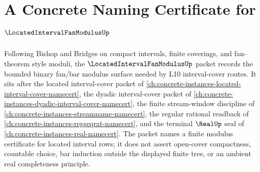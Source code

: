 \chapter{A Concrete Naming Certificate for $\LocatedIntervalFanModulusUp$}
\label{ch:concrete-instances-located-interval-fan-modulus-namecert}

Following Bishop and Bridges on compact intervals, finite coverings, and fan-theorem style moduli, the $\LocatedIntervalFanModulusUp$ packet records the bounded binary fan/bar modulus surface needed by L10 interval-cover routes. It sits after the located interval-cover packet of \autoref{ch:concrete-instances-located-interval-cover-namecert}, the dyadic interval-cover packet of \autoref{ch:concrete-instances-dyadic-interval-cover-namecert}, the finite stream-window discipline of \autoref{ch:concrete-instances-streamname-namecert}, the regular rational readback of \autoref{ch:concrete-instances-regseqrat-namecert}, and the terminal $\RealUp$ seal of \autoref{ch:concrete-instances-real-namecert}. The packet names a finite modulus certificate for located interval rows; it does not assert open-cover compactness, countable choice, bar induction outside the displayed finite tree, or an ambient real completeness principle.

